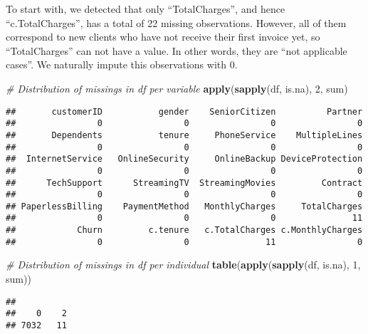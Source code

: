 \documentclass[
]{article}
\newenvironment{Shaded}{\begin{snugshade}}{\end{snugshade}}
\newcommand{\CommentTok}[1]{\textcolor[rgb]{0.56,0.35,0.01}{\textit{#1}}}
\newcommand{\DecValTok}[1]{\textcolor[rgb]{0.00,0.00,0.81}{#1}}
\newcommand{\FunctionTok}[1]{\textcolor[rgb]{0.13,0.29,0.53}{\textbf{#1}}}
\newcommand{\NormalTok}[1]{#1}
\newcommand{\OtherTok}[1]{\textcolor[rgb]{0.56,0.35,0.01}{#1}}
\newcommand{\SpecialCharTok}[1]{\textcolor[rgb]{0.81,0.36,0.00}{\textbf{#1}}}
\begin{document}
To start with, we detected that only ``TotalCharges'', and hence
``c.TotalCharges'', has a total of 22 missing observations. However, all
of them correspond to new clients who have not receive their first
invoice yet, so ``TotalCharges'' can not have a value. In other words,
they are ``not applicable cases''. We naturally impute this observations
with 0.

\begin{Shaded}
\begin{Highlighting}[]
\CommentTok{\# Distribution of missings in df per variable}
\FunctionTok{apply}\NormalTok{(}\FunctionTok{sapply}\NormalTok{(df, is.na), }\DecValTok{2}\NormalTok{, sum)}
\end{Highlighting}
\end{Shaded}

\begin{verbatim}
##       customerID           gender    SeniorCitizen          Partner 
##                0                0                0                0 
##       Dependents           tenure     PhoneService    MultipleLines 
##                0                0                0                0 
##  InternetService   OnlineSecurity     OnlineBackup DeviceProtection 
##                0                0                0                0 
##      TechSupport      StreamingTV  StreamingMovies         Contract 
##                0                0                0                0 
## PaperlessBilling    PaymentMethod   MonthlyCharges     TotalCharges 
##                0                0                0               11 
##            Churn         c.tenure   c.TotalCharges c.MonthlyCharges 
##                0                0               11                0
\end{verbatim}

\begin{Shaded}
\begin{Highlighting}[]
\CommentTok{\# Distribution of missings in df per individual}
\FunctionTok{table}\NormalTok{(}\FunctionTok{apply}\NormalTok{(}\FunctionTok{sapply}\NormalTok{(df, is.na), }\DecValTok{1}\NormalTok{, sum))}
\end{Highlighting}
\end{Shaded}

\begin{verbatim}
## 
##    0    2 
## 7032   11
\end{verbatim}

\begin{Shaded}
\end{Shaded}
\end{document}
